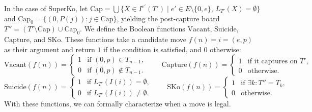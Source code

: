In the case of SuperKo, let $\mathrm{Cap} = \bigcup \{X \in I^{e'}(T') \mid e' \in E \setminus \{0, e\},\, L_{T'}(X) = \emptyset\}$ and $\mathrm{Cap}_0 = \{(0, P(j)) : j \in \mathrm{Cap}\}$, yielding the post-capture board $T'' = (T' \setminus \mathrm{Cap}) \cup \mathrm{Cap}_0$. We define the Boolean functions $\mathrm{Vacant}$, $\mathrm{Suicide}$, $\mathrm{Capture}$, and $\mathrm{SKo}$. These functions take a candidate move $f(n) = i = (e, p)$ as their argument and return $1$ if the condition is satisfied, and $0$ otherwise:
\[
\mathrm{Vacant}(f(n)) = \begin{cases}
	1 & \text{if } (0, p) \in T_{n-1},\\
	0 & \text{if } (0, p) \notin T_{n-1}.
\end{cases}
\qquad
\mathrm{Capture}(f(n)) = \begin{cases}
	1 & \text{if it captures on } T',\\
	0 & \text{otherwise.}
\end{cases}
\]
\[
\mathrm{Suicide}(f(n)) = \begin{cases}
	1 & \text{if } L_{T'}(I(i)) = \emptyset,\\
	0 & \text{if } L_{T'}(I(i)) \neq \emptyset.
\end{cases}
\qquad
\mathrm{SKo}(f(n)) = \begin{cases}
	1 & \text{if } \exists k: T'' = T_k,\\
	0 & \text{otherwise.}
\end{cases}
\]
With these functions, we can formally characterize when a move is legal.

